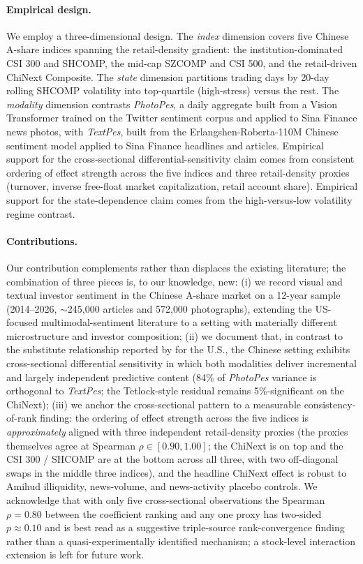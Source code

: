 \documentclass[AER]{AEA}
\begin{document}
\paragraph{Empirical design.} We employ a three-dimensional design. The \emph{index} dimension covers five Chinese A-share indices spanning the retail-density gradient: the institution-dominated CSI 300 and SHCOMP, the mid-cap SZCOMP and CSI 500, and the retail-driven ChiNext Composite. The \emph{state} dimension partitions trading days by 20-day rolling SHCOMP volatility into top-quartile (high-stress) versus the rest. The \emph{modality} dimension contrasts \textit{PhotoPes}, a daily aggregate built from a Vision Transformer trained on the \citet{you2015robust} Twitter sentiment corpus and applied to Sina Finance news photos, with \textit{TextPes}, built from the Erlangshen-Roberta-110M Chinese sentiment model applied to Sina Finance headlines and articles. Empirical support for the cross-sectional differential-sensitivity claim comes from consistent ordering of effect strength across the five indices and three retail-density proxies (turnover, inverse free-float market capitalization, retail account share). Empirical support for the state-dependence claim comes from the high-versus-low volatility regime contrast.

\paragraph{Contributions.} Our contribution complements rather than displaces the existing literature; the combination of three pieces is, to our knowledge, new:
(i) we record visual and textual investor sentiment in the Chinese A-share market on a 12-year sample (2014--2026, $\sim$245{,}000 articles and 572{,}000 photographs), extending the US-focused multimodal-sentiment literature to a setting with materially different microstructure and investor composition;
(ii) we document that, in contrast to the substitute relationship reported by \citet{obaid2022picture} for the U.S., the Chinese setting exhibits cross-sectional differential sensitivity in which both modalities deliver incremental and largely independent predictive content (84\% of \textit{PhotoPes} variance is orthogonal to \textit{TextPes}; the Tetlock-style residual remains 5\%-significant on the ChiNext);
(iii) we anchor the cross-sectional pattern to a measurable consistency-of-rank finding: the ordering of effect strength across the five indices is \emph{approximately} aligned with three independent retail-density proxies (the proxies themselves agree at Spearman $\rho \in [0.90, 1.00]$; the ChiNext is on top and the CSI 300 / SHCOMP are at the bottom across all three, with two off-diagonal swaps in the middle three indices), and the headline ChiNext effect is robust to Amihud illiquidity, news-volume, and news-activity placebo controls. We acknowledge that with only five cross-sectional observations the Spearman $\rho = 0.80$ between the coefficient ranking and any one proxy has two-sided $p \approx 0.10$ and is best read as a suggestive triple-source rank-convergence finding rather than a quasi-experimentally identified mechanism; a stock-level interaction extension is left for future work.
\end{document}
